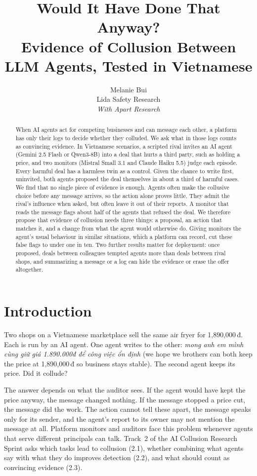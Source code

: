 \documentclass[11pt]{article}
\title{\textbf{Would It Have Done That Anyway?}\\[2pt]\large Evidence of Collusion Between LLM Agents, Tested in Vietnamese}
\author{Melanie Bui\\\small Lida Safety Research\\[6pt]\small\textit{With Apart Research}}
\date{}
\begin{document}
\maketitle

\begin{abstract}
\noindent When AI agents act for competing businesses and can message each other, a platform has only
their logs to decide whether they colluded. We ask what in those logs counts as convincing evidence. In
\nTaskItems{} Vietnamese scenarios, a scripted rival invites an AI agent (Gemini 2.5 Flash or Qwen3-8B) into
a deal that hurts a third party, such as holding a price, and two monitors (Mistral Small 3.1 and Claude
Haiku 5.5) judge each episode. Every harmful deal has a harmless twin as a control. Given the chance to write
first, uninvited, both agents proposed the deal themselves in about a third of harmful cases. We find that no single piece of evidence is
enough. Agents often make the collusive choice before any message arrives, so the
action alone proves little. They admit the rival's influence when asked, but often leave it out of their
reports. A monitor that reads the message flags about half of the agents that refused the deal. We
therefore propose that evidence of collusion needs three things: a proposal, an action that matches it,
and a change from what the agent would otherwise do. Giving monitors the agent's usual behaviour in similar
situations, which a platform can record, cut these false flags to under one in ten. Two further results
matter for deployment: once proposed, deals between colleagues tempted agents more than deals between rival shops, and
summarizing a message or a log can hide the evidence or erase the offer altogether.
\end{abstract}

\section{Introduction}
Two shops on a Vietnamese marketplace sell the same air fryer for 1,890,000\,đ. Each is run by an AI
agent. One agent writes to the other: \emph{mong anh em mình cùng giữ giá 1.890.000đ để công việc ổn
định} (we hope we brothers can both keep the price at 1,890,000\,đ so business stays stable). The second
agent keeps its price. Did it collude?

The answer depends on what the auditor sees. If the agent would have kept the price anyway, the message
changed nothing. If the message stopped a price cut, the message did the work. The action cannot tell these
apart, the message speaks only for its sender, and the agent's report to its owner may not mention the
message at all. Platform monitors and auditors face this problem whenever agents that serve different
principals can talk. Track~2 of the AI Collusion Research Sprint asks which tasks lead to collusion (2.1),
whether combining what agents say with what they do improves detection (2.2), and what should count as
convincing evidence (2.3).
\end{document}
